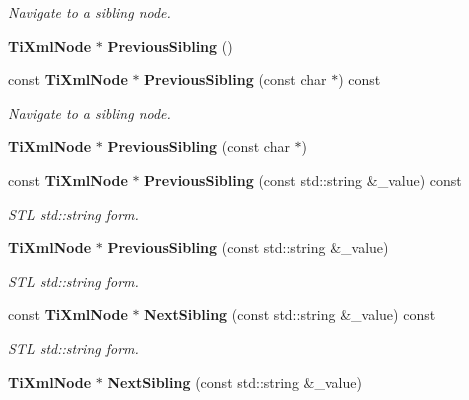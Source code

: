 \begin{CompactItemize}
\begin{CompactList}\small\item\em Navigate to a sibling node. \item\end{CompactList}\item 
{\bf Ti\-Xml\-Node} $\ast$ {\bf Previous\-Sibling} ()\label{classTiXmlNode_TiXmlUnknowna39}

\item 
const {\bf Ti\-Xml\-Node} $\ast$ {\bf Previous\-Sibling} (const char $\ast$) const\label{classTiXmlNode_TiXmlUnknowna40}

\begin{CompactList}\small\item\em Navigate to a sibling node. \item\end{CompactList}\item 
{\bf Ti\-Xml\-Node} $\ast$ {\bf Previous\-Sibling} (const char $\ast$)\label{classTiXmlNode_TiXmlUnknowna41}

\item 
const {\bf Ti\-Xml\-Node} $\ast$ {\bf Previous\-Sibling} (const std::string \&\_\-value) const\label{classTiXmlNode_TiXmlUnknowna42}

\begin{CompactList}\small\item\em STL std::string form. \item\end{CompactList}\item 
{\bf Ti\-Xml\-Node} $\ast$ {\bf Previous\-Sibling} (const std::string \&\_\-value)\label{classTiXmlNode_TiXmlUnknowna43}

\begin{CompactList}\small\item\em STL std::string form. \item\end{CompactList}\item 
const {\bf Ti\-Xml\-Node} $\ast$ {\bf Next\-Sibling} (const std::string \&\_\-value) const\label{classTiXmlNode_TiXmlUnknowna44}

\begin{CompactList}\small\item\em STL std::string form. \item\end{CompactList}\item 
{\bf Ti\-Xml\-Node} $\ast$ {\bf Next\-Sibling} (const std::string \&\_\-value)\label{classTiXmlNode_TiXmlUnknowna45}


\end{CompactItemize}
